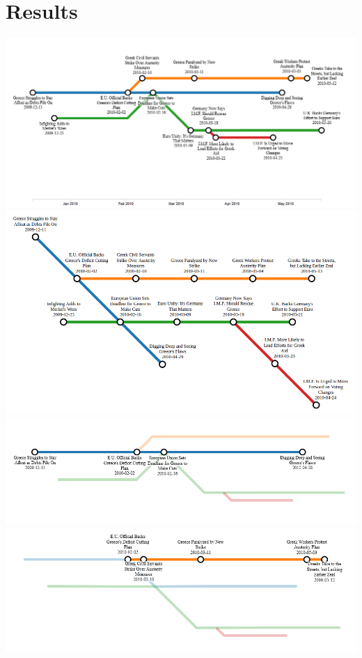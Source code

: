 \documentclass{chi2009}
\begin{document}
\section{Results}

\includegraphics[width=\columnwidth]{TimeScaledMap.png}
\includegraphics[width=\columnwidth]{TopologicalMap.png}
\includegraphics[width=\columnwidth]{Metro1.png}
\includegraphics[width=\columnwidth]{Metro2.png}
\end{document}
